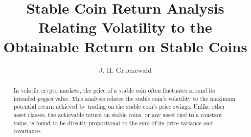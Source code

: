 \begin{frontmatter}
%
\title{%
Stable Coin Return Analysis\\
\small Relating Volatility to the Obtainable Return on Stable Coins  %
}
%
\author[address]{J. H. Gruenewald} 
\address[address]{https://github.com/johngru}
%
%
\renewcommand*{\today}{\DayMonthYearDateFormat\displaydate{dateName}} 
%
\begin{abstract}

In volatile crypto markets, the price of a stable coin often fluctuates around its intended \textit{pegged} value.  This analysis relates the stable coin's volatility to the maximum potential return achieved by trading on the stable coin's price swings.  Unlike other asset classes, the achievable return on stable coins, or any asset tied to a constant value, is found to be directly proportional to the sum of its price variance and covariance.  

\end{abstract}
%
\end{frontmatter}
%
%
%

